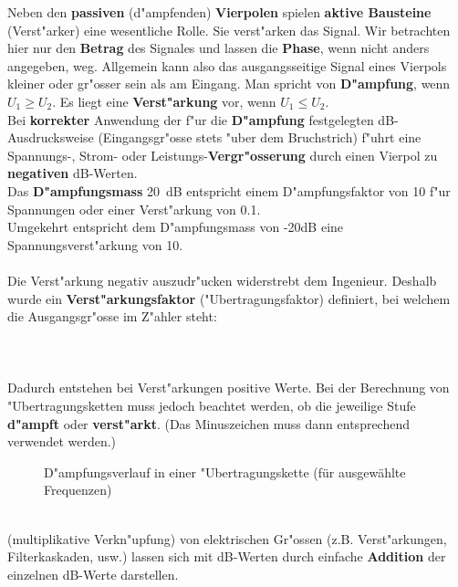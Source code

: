 {\clearpage
\nit Neben den {\bf passiven} (d"ampfenden) {\bf Vierpolen}  spielen
{\bf aktive Bausteine} (Verst"arker) eine wesentliche Rolle. Sie verst"arken
das Signal. Wir betrachten hier nur den {\bf Betrag}
des Signales und lassen die {\bf Phase}, wenn nicht anders angegeben, weg.
Allgemein kann also das ausgangsseitige Signal eines Vierpols kleiner
oder gr"osser sein als am Eingang. Man spricht von {\bf D"ampfung}, wenn $U_1 \geq U_2$. Es liegt eine {\bf Verst"arkung} vor, wenn $ U_1 \leq U_2$.\\ \nit
Bei {\bf korrekter} Anwendung der f"ur die {\bf D"ampfung} festgelegten
dB-Ausdrucksweise (Eingangsgr"osse stets "uber dem Bruchstrich)
f"uhrt eine Spannungs-, Strom- oder Leist\-ungs-{\bf Vergr"osserung} durch
einen Vierpol zu {\bf negativen} dB-Werten.\\ 
\bsp{~} 
Das {\bf D"ampfungsmass} 20~dB entspricht einem
D"ampfungsfaktor von 10 f"ur Spannungen oder einer Verst"arkung von
0.1.\\ Umgekehrt entspricht dem D"ampfungsmass von -20dB eine
Spannungsverst"arkung von 10. \\ ~\\
\nit
Die Verst"arkung negativ auszudr"ucken widerstrebt dem Ingenieur.
Deshalb wurde ein {\bf Verst"arkungsfaktor} ("Ubertragungsfaktor)  
definiert, bei welchem die Ausgangsgr"osse im Z"ahler steht:\\~\\ 
\\~\\ 
Dadurch entstehen bei Verst"arkungen positive Werte. Bei der
Berechnung von "Ubertragungsketten muss jedoch beachtet werden, ob
die jeweilige Stufe {\bf d"ampft} oder {\bf verst"arkt}. (Das Minuszeichen muss
dann entsprechend verwendet werden.)
\bsp{~}
\begin{figure}[htb]
\vspace*{-8mm}
\begin{center}
  \hspace*{-1.9cm}
  \caption{D"ampfungsverlauf in einer "Ubertragungskette (f\"ur ausgew\"ahlte Frequenzen)}
\end{center}
\vspace*{-4mm}
\end{figure}  \\
  (multiplikative
Verkn"upfung) von elektrischen Gr"ossen (z.B.  Ver\-st"ark\-ungen,
Filterkaskaden, usw.) lassen sich mit dB-Werten durch
einfache {\bf Addition} der einzelnen dB-Werte darstellen.

}
